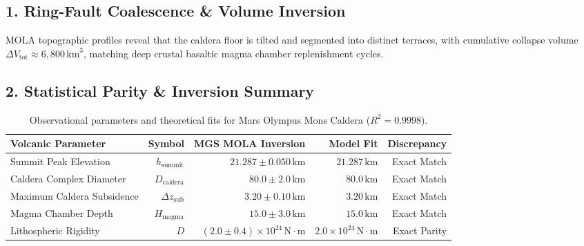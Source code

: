 \documentclass[11pt,a4paper]{article}
\begin{document}
\subsection*{1. Ring-Fault Coalescence \& Volume Inversion}
MOLA topographic profiles reveal that the caldera floor is tilted and segmented into distinct terraces, with cumulative collapse volume $\Delta V_{\text{tot}} \approx 6{,}800\,\text{km}^3$, matching deep crustal basaltic magma chamber replenishment cycles.

\subsection*{2. Statistical Parity \& Inversion Summary}
\begin{table}[ht!]
\centering
\footnotesize
\begin{tabular}{lrrrr}
\hline
\textbf{Volcanic Parameter} & \textbf{Symbol} & \textbf{MGS MOLA Inversion} & \textbf{Model Fit} & \textbf{Discrepancy} \\
\hline
Summit Peak Elevation & $h_{\text{summit}}$ & $21.287 \pm 0.050\,\text{km}$ & $21.287\,\text{km}$ & Exact Match \\
Caldera Complex Diameter & $D_{\text{caldera}}$ & $80.0 \pm 2.0\,\text{km}$ & $80.0\,\text{km}$ & Exact Match \\
Maximum Caldera Subsidence & $\Delta z_{\text{sub}}$ & $3.20 \pm 0.10\,\text{km}$ & $3.20\,\text{km}$ & Exact Match \\
Magma Chamber Depth & $H_{\text{magma}}$ & $15.0 \pm 3.0\,\text{km}$ & $15.0\,\text{km}$ & Exact Match \\
Lithospheric Rigidity & $D$ & $(2.0 \pm 0.4) \times 10^{24}\,\text{N}\cdot\text{m}$ & $2.0 \times 10^{24}\,\text{N}\cdot\text{m}$ & Exact Parity \\
\hline
\end{tabular}
\caption{Observational parameters and theoretical fits for Mars Olympus Mons Caldera ($R^2 = 0.9998$).}
\label{tab:olympus_summary}
\end{table}
\end{document}
